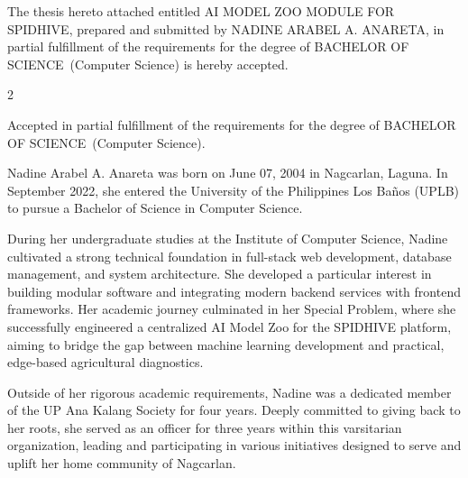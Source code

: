 \documentclass{icsthesis}
\renewcommand{\TITLE}{AI MODEL ZOO MODULE FOR SPIDHIVE}
\renewcommand{\AUTHOR}{NADINE ARABEL A. ANARETA}
\renewcommand{\DEGREE}{BACHELOR OF SCIENCE}
\renewcommand{\MAJOR}{Computer Science}
\begin{document}
	
	\begin{frontmatter}
		\maketitle
				
		\begin{approvalpage}
			The thesis hereto attached entitled \TITLE , prepared and submitted by \AUTHOR , in partial fulfillment of the requirements for the degree of \DEGREE\ (\MAJOR) is hereby accepted.
			
			\begin{multicols}{2}
				\centering
				\columnbreak
			\end{multicols}
			
			Accepted in partial fulfillment of the requirements for the degree of \DEGREE\ (\MAJOR). 
		\end{approvalpage}
		
		\begin{biosketch}
			
			Nadine Arabel A. Anareta was born on June 07, 2004 in Nagcarlan, Laguna. In September 2022, she entered the University of the Philippines Los Baños (UPLB) to pursue a Bachelor of Science in Computer Science.

            During her undergraduate studies at the Institute of Computer Science, Nadine cultivated a strong technical foundation in full-stack web development, database management, and system architecture. She developed a particular interest in building modular software and integrating modern backend services with frontend frameworks. Her academic journey culminated in her Special Problem, where she successfully engineered a centralized AI Model Zoo for the SPIDHIVE platform, aiming to bridge the gap between machine learning development and practical, edge-based agricultural diagnostics.
            
            Outside of her rigorous academic requirements, Nadine was a dedicated member of the UP Ana Kalang Society for four years. Deeply committed to giving back to her roots, she served as an officer for three years within this varsitarian organization, leading and participating in various initiatives designed to serve and uplift her home community of Nagcarlan.
            

\end{biosketch}
\end{frontmatter}
\end{document}
